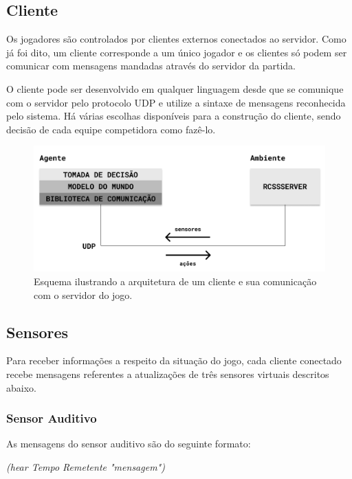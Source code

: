 \subsection{Cliente}
\par Os jogadores são controlados por clientes externos conectados ao servidor. Como já foi dito, um cliente corresponde a um único jogador e os clientes só podem ser comunicar com mensagens mandadas através do servidor da partida.
\par O cliente pode ser desenvolvido em qualquer linguagem desde que se comunique com o servidor pelo protocolo UDP e utilize a sintaxe de mensagens reconhecida pelo sistema. Há várias escolhas disponíveis para a construção do cliente, sendo decisão de cada equipe competidora como fazê-lo.

\begin{figure}[H]
	\includegraphics[width=0.9\linewidth]{figs/system.png}
	\centering
	\caption{Esquema ilustrando a arquitetura de um cliente e sua comunicação com o servidor do jogo.}
	\label{fig:system}
\end{figure}

\subsection{Sensores}


Para receber informações a respeito da situação do jogo, cada cliente conectado recebe mensagens referentes a atualizações de três sensores virtuais descritos abaixo.

\subsubsection{Sensor Auditivo}

As mensagens do sensor auditivo são do seguinte formato:

\textit{(hear Tempo Remetente "mensagem")}

